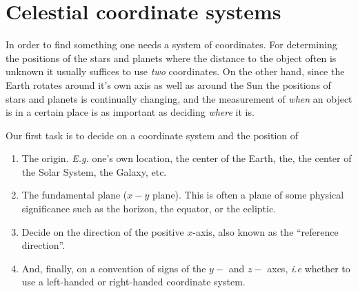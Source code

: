 
%
\chapter{Celestial coordinate systems}

In order to find something one needs a system of coordinates. For 
determining the positions of the stars and planets where the 
distance to the object often is unknown it usually suffices to use {\it two} 
coordinates. On the other hand, since the Earth rotates around it's 
own axis as well as around the Sun the positions of stars and planets 
is continually changing, and the measurement of {\it when} an object 
is in a certain place is as important as deciding {\it where} it is. 

Our first task is to decide on a coordinate system and the position of
\begin{enumerate}
\item The origin. {\it E.g.} one's own location, the center of the Earth,
the, the center of the Solar System, the Galaxy, etc. 
\item The fundamental plane ($x-y$ plane). This is often a plane of some
physical significance such as the horizon, the equator, or the ecliptic.
\item Decide on the direction of the positive $x$-axis, also known as
the ``reference direction''. 
\item And, finally, on a convention of signs of the $y-$ and $z-$ axes, {\it i.e} whether
to use a left-handed or right-handed coordinate system.
\end{enumerate}

